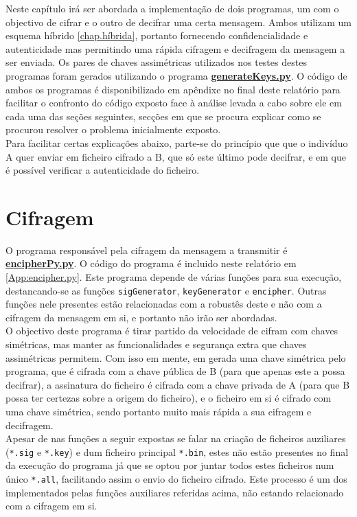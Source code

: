 \documentclass[a4paper,11pt,openright,oneside]{report}
\begin{document}
Neste capítulo irá ser abordada a implementação de dois programas, um com o objectivo de cifrar e o outro de decifrar uma certa mensagem. Ambos utilizam um esquema híbrido \ref{chap.híbrida}, portanto fornecendo confidencialidade e autenticidade mas permitindo uma rápida cifragem e decifragem da mensagem a ser enviada. Os pares de chaves assimétricas utilizados nos testes destes programas foram gerados utilizando o programa \href{run:../Python/KeysGenerator/generateKeys.py}{\textbf{generateKeys.py}}. O código de ambos os programas é disponibilizado em apêndixe no final deste relatório para facilitar o confronto do código exposto face à análise levada a cabo sobre ele em cada uma das seções seguintes, secções em que se procura explicar como se procurou resolver o problema inicialmente exposto.\\
Para facilitar certas explicações abaixo, parte-se do princípio que que o indivíduo A quer enviar em ficheiro cifrado a B, que só este último pode decifrar, e em que é possível verificar a autenticidade do ficheiro.

\section{Cifragem}

O programa responsável pela cifragem da mensagem a transmitir é \href{run:../Python/Sender/encipherPy.py}{\textbf{encipherPy.py}}. O código do programa é incluido neste relatório em \ref{App:encipher.py}.
Este programa depende de várias funções para sua execução, destancando-se as funções \verb|sigGenerator|, \verb|keyGenerator| e \verb|encipher|. Outras funções nele presentes estão relacionadas com a robustês deste e não com a cifragem da mensagem em si, e portanto não irão ser abordadas.\\
O objectivo deste programa é tirar partido da velocidade de cifram com chaves simétricas, mas manter as funcionalidades e segurança extra que chaves assimétricas permitem. Com isso em mente, em gerada uma chave simétrica pelo programa, que é cifrada com a chave pública de B (para que apenas este a possa decifrar), a assinatura do ficheiro é cifrada com a chave privada de A (para que B possa ter certezas sobre a origem do ficheiro), e o ficheiro em si é cifrado com uma chave simétrica, sendo portanto muito mais rápida a sua cifragem e decifragem.\\
Apesar de nas funções a seguir expostas se falar na criação de ficheiros auziliares (\verb|*.sig| e \verb|*.key|) e dum ficheiro principal \verb|*.bin|, estes não estão presentes no final da execução do programa já que se optou por juntar todos estes ficheiros num único \verb|*.all|, facilitando assim o envio do ficheiro cifrado. Este processo é um dos implementados pelas funções auxiliares referidas acima, não estando relacionado com a cifragem em si.
\end{document}
